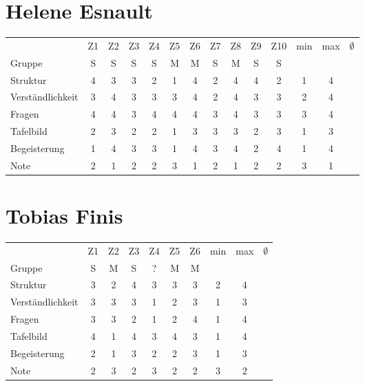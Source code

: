 \documentclass[a4paper]{article}
\begin{document}
\section{Helene Esnault}
\begin{tabular}{l|cccccccccc|cc|c}
&Z1&Z2&Z3&Z4&Z5&Z6&Z7&Z8&Z9&Z10&min&max&$\emptyset$\\
Gruppe               &S&S&S&S&M&M&S&M&S&S\\
\hline
Struktur             &4&3&3&2&1&4&2&4&4&2&1&4\\
Verst\"andlichkeit   &3&4&3&3&3&4&2&4&3&3&2&4\\
Fragen               &4&4&3&4&4&4&3&4&3&3&3&4\\
Tafelbild            &2&3&2&2&1&3&3&3&2&3&1&3\\
Begeisterung         &1&4&3&3&1&4&3&4&2&4&1&4\\
\hline
Note                 &2&1&2&2&3&1&2&1&2&2&3&1
\end{tabular}

\section{Tobias Finis}
\begin{tabular}{l|cccccc|cc|c}
&Z1&Z2&Z3&Z4&Z5&Z6&min&max&$\emptyset$\\
Gruppe               &S&M&S&?&M&M\\
\hline
Struktur             &3&2&4&3&3&3&2&4\\
Verst\"andlichkeit   &3&3&3&1&2&3&1&3\\
Fragen               &3&3&2&1&2&4&1&4\\
Tafelbild            &4&1&4&3&4&3&1&4\\
Begeisterung         &2&1&3&2&2&3&1&3\\
\hline
Note                 &2&3&2&3&2&2&3&2
\end{tabular}
\end{document}
